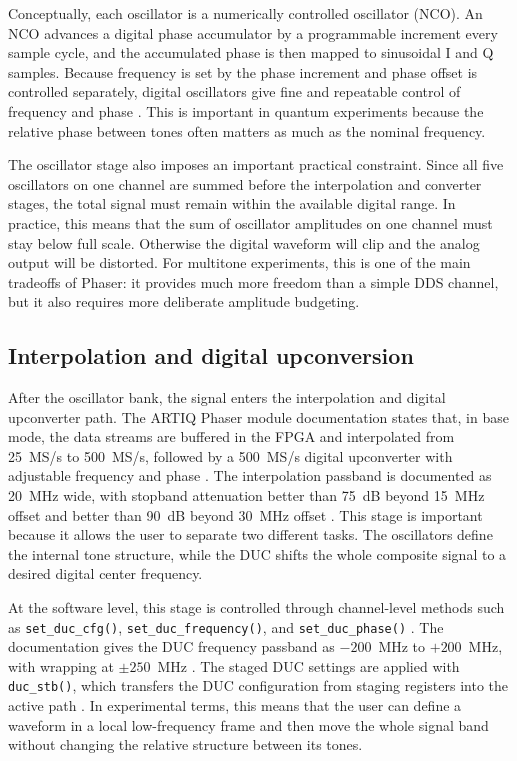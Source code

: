Conceptually, each oscillator is a numerically controlled oscillator (NCO). An NCO advances a digital phase accumulator by a programmable increment every sample cycle, and the accumulated phase is then mapped to sinusoidal I and Q samples. Because frequency is set by the phase increment and phase offset is controlled separately, digital oscillators give fine and repeatable control of frequency and phase \cite{adi_mt085}. This is important in quantum experiments because the relative phase between tones often matters as much as the nominal frequency.

The oscillator stage also imposes an important practical constraint. Since all five oscillators on one channel are summed before the interpolation and converter stages, the total signal must remain within the available digital range. In practice, this means that the sum of oscillator amplitudes on one channel must stay below full scale. Otherwise the digital waveform will clip and the analog output will be distorted. For multitone experiments, this is one of the main tradeoffs of Phaser: it provides much more freedom than a simple DDS channel, but it also requires more deliberate amplitude budgeting.

\subsection{Interpolation and digital upconversion}

After the oscillator bank, the signal enters the interpolation and digital upconverter path. The ARTIQ Phaser module documentation states that, in base mode, the data streams are buffered in the FPGA and interpolated from 25~MS/s to 500~MS/s, followed by a 500~MS/s digital upconverter with adjustable frequency and phase \cite{artiq_phaser_module}. The interpolation passband is documented as 20~MHz wide, with stopband attenuation better than 75~dB beyond 15~MHz offset and better than 90~dB beyond 30~MHz offset \cite{artiq_phaser_module}. This stage is important because it allows the user to separate two different tasks. The oscillators define the internal tone structure, while the DUC shifts the whole composite signal to a desired digital center frequency.

At the software level, this stage is controlled through channel-level methods such as \texttt{set\_duc\_cfg()}, \texttt{set\_duc\_frequency()}, and \texttt{set\_duc\_phase()} \cite{artiq_coredrivers}. The documentation gives the DUC frequency passband as \(-200\)~MHz to \(+200\)~MHz, with wrapping at \(\pm 250\)~MHz \cite{artiq_coredrivers}. The staged DUC settings are applied with \texttt{duc\_stb()}, which transfers the DUC configuration from staging registers into the active path \cite{artiq_coredrivers}. In experimental terms, this means that the user can define a waveform in a local low-frequency frame and then move the whole signal band without changing the relative structure between its tones.

